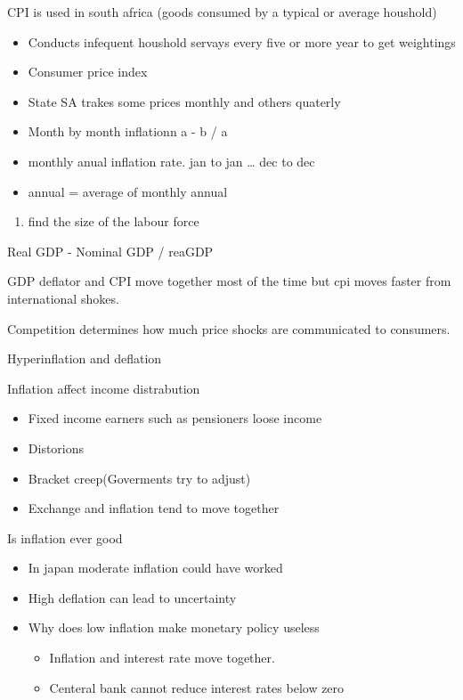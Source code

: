 \documentclass[twocolumn]{article}
\providecommand{\tightlist}{%
  \setlength{\itemsep}{0pt}\setlength{\parskip}{0pt}}
\begin{document}
CPI is used in south africa (goods consumed by a typical or average
houshold)

\begin{itemize}
\tightlist
\item
  Conducts infequent houshold servays every five or more year to get
  weightings
\item
  Consumer price index
\item
  State SA trakes some prices monthly and others quaterly
\item
  Month by month inflationn a - b / a
\item
  monthly anual inflation rate. jan to jan \ldots{} dec to dec
\item
  annual = average of monthly annual
\end{itemize}

\begin{enumerate}
\tightlist
\item
  find the size of the labour force
\end{enumerate}

\begin{description}
\tightlist
\item[GDP deflator]
Real GDP - Nominal GDP / reaGDP
\end{description}

GDP deflator and CPI move together most of the time but cpi moves faster
from international shokes.

Competition determines how much price shocks are communicated to
consumers.

Hyperinflation and deflation

Inflation affect income distrabution

\begin{itemize}
\tightlist
\item
  Fixed income earners such as pensioners loose income
\item
  Distorions
\item
  Bracket creep(Goverments try to adjust)
\item
  Exchange and inflation tend to move together
\end{itemize}

Is inflation ever good

\begin{itemize}
\tightlist
\item
  In japan moderate inflation could have worked
\item
  High deflation can lead to uncertainty
\item
  Why does low inflation make monetary policy useless

  \begin{itemize}
  \tightlist
  \item
    Inflation and interest rate move together.
  \item
    Centeral bank cannot reduce interest rates below zero
  \end{itemize}
\end{itemize}
\end{document}
